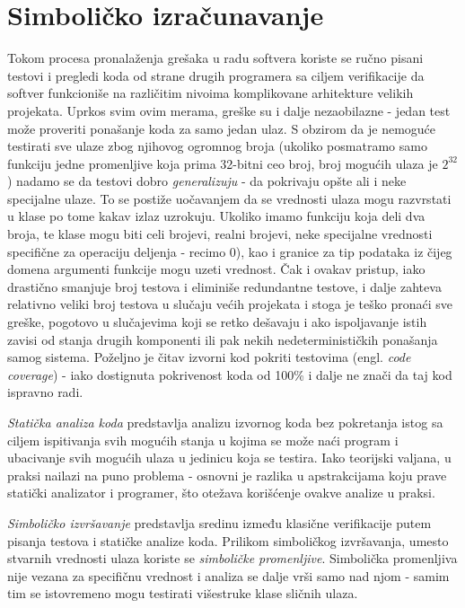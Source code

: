 \section{Simboličko izračunavanje}
\label{sec:Symbolics}

Tokom procesa pronalaženja grešaka u radu softvera koriste se ručno pisani testovi i pregledi koda od strane drugih programera sa ciljem verifikacije da softver funkcioniše na različitim nivoima komplikovane arhitekture velikih projekata. Uprkos svim ovim merama, greške su i dalje nezaobilazne - jedan test može proveriti ponašanje koda za samo jedan ulaz. S obzirom da je nemoguće testirati sve ulaze zbog njihovog ogromnog broja (ukoliko posmatramo samo funkciju jedne promenljive koja prima 32-bitni ceo broj, broj mogućih ulaza je $2^{32}$) nadamo se da testovi dobro \emph{generalizuju} - da pokrivaju opšte ali i neke specijalne ulaze. To se postiže uočavanjem da se vrednosti ulaza mogu razvrstati u klase po tome kakav izlaz uzrokuju. Ukoliko imamo funkciju koja deli dva broja, te klase mogu biti celi brojevi, realni brojevi, neke specijalne vrednosti specifične za operaciju deljenja - recimo $0$), kao i granice za tip podataka iz čijeg domena argumenti funkcije mogu uzeti vrednost. Čak i ovakav pristup, iako drastično smanjuje broj testova i eliminiše redundantne testove, i dalje zahteva relativno veliki broj testova u slučaju većih projekata i stoga je teško pronaći sve greške, pogotovo u slučajevima koji se retko dešavaju i ako ispoljavanje istih zavisi od stanja drugih komponenti ili pak nekih nedeterminističkih ponašanja samog sistema. Poželjno je čitav izvorni kod pokriti  testovima (engl. \emph{code coverage}) - iako dostignuta pokrivenost koda od 100\% i dalje ne znači da taj kod ispravno radi.

\emph{Statička analiza koda} predstavlja analizu izvornog koda bez pokretanja istog sa ciljem ispitivanja svih mogućih stanja u kojima se može naći program i ubacivanje svih mogućih ulaza u jedinicu koja se testira. Iako teorijski valjana, u praksi nailazi na puno problema - osnovni je razlika u apstrakcijama koju prave statički analizator i programer, što otežava korišćenje ovakve analize u praksi.

\emph{Simboličko izvršavanje} \cite{SymbolicExecution} predstavlja sredinu između klasične verifikacije putem pisanja testova i statičke analize koda. Prilikom simboličkog izvršavanja, umesto stvarnih vrednosti ulaza koriste se \emph{simboličke promenljive}. Simbolička promenljiva nije vezana za specifičnu vrednost i analiza se dalje vrši samo nad njom - samim tim se istovremeno mogu testirati višestruke klase sličnih ulaza. 


